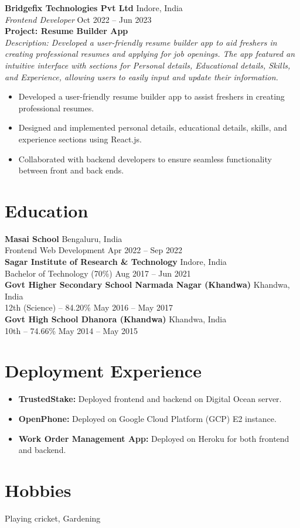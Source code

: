 \documentclass[a4paper,11pt]{article}
\begin{document}
\noindent\textbf{Bridgefix Technologies Pvt Ltd} \hfill Indore, India \\
\textit{Frontend Developer} \hfill Oct 2022 – Jun 2023 \\
\textbf{Project: Resume Builder App} \\
\textit{Description: Developed a user-friendly resume builder app to aid freshers in creating professional resumes and applying for job openings. The app featured an intuitive interface with sections for Personal details, Educational details, Skills, and Experience, allowing users to easily input and update their information.}\\
\begin{itemize}[leftmargin=*]
    \item Developed a user-friendly resume builder app to assist freshers in creating professional resumes.
    \item Designed and implemented personal details, educational details, skills, and experience sections using React.js.
    \item Collaborated with backend developers to ensure seamless functionality between front and back ends.
\end{itemize}

\section*{Education}
\noindent\textbf{Masai School} \hfill Bengaluru, India \\
Frontend Web Development \hfill Apr 2022 – Sep 2022 \\

\noindent\textbf{Sagar Institute of Research \& Technology} \hfill Indore, India \\
Bachelor of Technology (70\%) \hfill Aug 2017 – Jun 2021 \\

\noindent\textbf{Govt Higher Secondary School Narmada Nagar (Khandwa)} \hfill Khandwa, India \\
12th (Science) – 84.20\% \hfill May 2016 – May 2017 \\

\noindent\textbf{Govt High School Dhanora (Khandwa)} \hfill Khandwa, India \\
10th – 74.66\% \hfill May 2014 – May 2015 \\

\section*{Deployment Experience}
\begin{itemize}[leftmargin=*]
    \item \textbf{TrustedStake:} Deployed frontend and backend on Digital Ocean server.
    \item \textbf{OpenPhone:} Deployed on Google Cloud Platform (GCP) E2 instance.
    \item \textbf{Work Order Management App:} Deployed on Heroku for both frontend and backend.
\end{itemize}

\section*{Hobbies}
Playing cricket, Gardening
\end{document}
